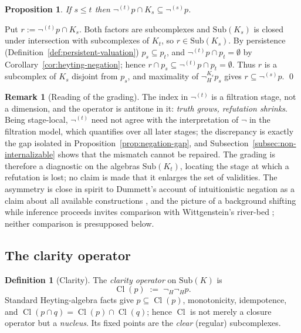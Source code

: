 \documentclass[final,12pt]{elsarticle}
\theoremstyle{plain}
\newtheorem{prop}[thm]{Proposition}
\theoremstyle{definition}
\newtheorem{defi}[thm]{Definition}
\newtheorem{rem}[thm]{Remark}
\begin{document}
\begin{prop}
\label{prop:graded-antitone}
If \(s\le t\) then \(\neg^{(t)}p\cap K_s\subseteq\neg^{(s)}p\).
\end{prop}

\proof
Put \(r:=\neg^{(t)}p\cap K_s\).  Both factors are subcomplexes and
\(\mathrm{Sub}(K_s)\) is closed under intersection with subcomplexes of
\(K_t\), so \(r\in\mathrm{Sub}(K_s)\).  By persistence
(Definition~\ref{def:persistent-valuation}) \(p_s\subseteq p_t\), and
\(\neg^{(t)}p\cap p_t=\emptyset\) by Corollary~\ref{cor:heyting-negation};
hence \(r\cap p_s\subseteq \neg^{(t)}p\cap p_t=\emptyset\).  Thus \(r\) is a
subcomplex of \(K_s\) disjoint from \(p_s\), and maximality of
\(\neg_H^{K_s}p_s\) gives \(r\subseteq\neg^{(s)}p\).
\qed

\begin{rem}[Reading of the grading]
\label{rem:graded-negation-status}
The index in \(\neg^{(t)}\) is a filtration stage, not a dimension, and the
operator is antitone in it: \emph{truth grows, refutation shrinks}.  Being
stage-local, \(\neg^{(t)}\) need not agree with the interpretation of \(\neg\)
in the filtration model, which quantifies over all later stages; the
discrepancy is exactly the gap isolated in
Proposition~\ref{prop:negation-gap}, and
Subsection~\ref{subsec:non-internalizable} shows that the mismatch cannot be
repaired.  The grading is therefore a diagnostic on the algebras
\(\mathrm{Sub}(K_t)\), locating the stage at which a refutation is lost; no
claim is made that it enlarges the set of validities.  The asymmetry is close
in spirit to Dummett's account of intuitionistic negation as a claim about all
available constructions \cite{dummett1977}, and the picture of a background
shifting while inference proceeds invites comparison with Wittgenstein's
river-bed \cite[\S\S96--99]{wittgenstein1969}; neither comparison is
presupposed below.
\end{rem}

\subsection{The clarity operator}
\label{subsec:clarity}

\begin{defi}[Clarity]
\label{def:clarity}
The \emph{clarity operator} on \(\mathrm{Sub}(K)\) is
\[
  \mathop{\mathrm{Cl}}(p)\;:=\;\neg_H\neg_H p .
\]
Standard Heyting-algebra facts give \(p\subseteq\mathop{\mathrm{Cl}}(p)\),
monotonicity, idempotence, and
\(\mathop{\mathrm{Cl}}(p\cap q)=\mathop{\mathrm{Cl}}(p)\cap
\mathop{\mathrm{Cl}}(q)\); hence \(\mathop{\mathrm{Cl}}\) is not merely a
closure operator but a \emph{nucleus}.  Its fixed points are the \emph{clear}
(regular) subcomplexes.
\end{defi}
\end{document}
